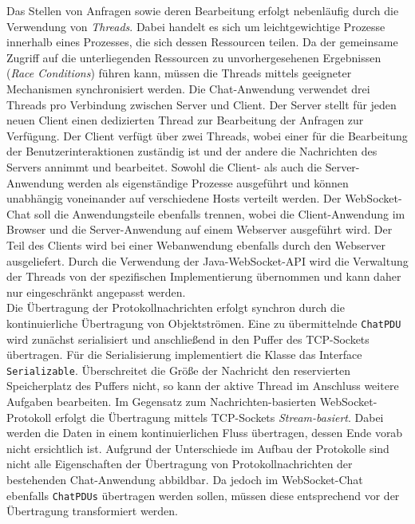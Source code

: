 \documentclass[11pt,a4paper,titlepage]{scrartcl}
\numberwithin{equation}{section}
\begin{document}
\noindent Das Stellen von Anfragen sowie deren Bearbeitung erfolgt nebenläufig durch die Verwendung von \textit{Threads}. Dabei handelt es sich um leichtgewichtige Prozesse innerhalb eines Prozesses, die sich dessen Ressourcen teilen. Da der gemeinsame Zugriff auf die unterliegenden Ressourcen zu unvorhergesehenen Ergebnissen (\textit{Race Conditions}) führen kann, müssen die Threads mittels geeigneter Mechanismen synchronisiert werden. Die Chat-Anwendung verwendet drei Threads pro Verbindung zwischen Server und Client. Der Server stellt für jeden neuen Client einen dedizierten Thread zur Bearbeitung der Anfragen zur Verfügung. Der Client verfügt über zwei Threads, wobei einer für die Bearbeitung der Benutzerinteraktionen zuständig ist und der andere die Nachrichten des Servers annimmt und bearbeitet. Sowohl die Client- als auch die Server-Anwendung werden als eigenständige Prozesse ausgeführt und können unabhängig voneinander auf verschiedene Hosts verteilt werden. Der WebSocket-Chat soll die Anwendungsteile ebenfalls trennen, wobei die Client-Anwendung im Browser und die Server-Anwendung auf einem Webserver ausgeführt wird. Der Teil des Clients wird bei einer Webanwendung ebenfalls durch den Webserver ausgeliefert. Durch die Verwendung der Java-WebSocket-API wird die Verwaltung der Threads von der spezifischen Implementierung übernommen und kann daher nur eingeschränkt angepasst werden. \\

\noindent Die Übertragung der Protokollnachrichten erfolgt synchron durch die kontinuierliche Übertragung von Objektströmen. Eine zu übermittelnde \texttt{ChatPDU} wird zunächst serialisiert und anschließend in den Puffer des TCP-Sockets übertragen. Für die Serialisierung implementiert die Klasse das Interface \texttt{Serializable}. Überschreitet die Größe der Nachricht den reservierten Speicherplatz des Puffers nicht, so kann der aktive Thread im Anschluss weitere Aufgaben bearbeiten. Im Gegensatz zum Nachrichten-basierten WebSocket-Protokoll erfolgt die Übertragung mittels TCP-Sockets \textit{Stream-basiert}. Dabei werden die Daten in einem kontinuierlichen Fluss übertragen, dessen Ende vorab nicht ersichtlich ist. Aufgrund der Unterschiede im Aufbau der Protokolle sind nicht alle Eigenschaften der Übertragung von Protokollnachrichten der bestehenden Chat-Anwendung abbildbar. Da jedoch im WebSocket-Chat ebenfalls \texttt{ChatPDUs} übertragen werden sollen, müssen diese entsprechend vor der Übertragung transformiert werden.
\end{document}
